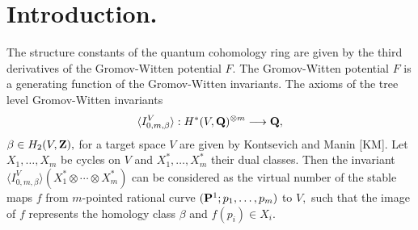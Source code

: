 \section{Introduction.}

The structure constants of the quantum cohomology ring 
are given by the third derivatives of the Gromov-Witten 
potential $F.$ The Gromov-Witten potential $F$ is a 
generating function of the Gromov-Witten invariants. 
The axioms of the tree level Gromov-Witten invariants 
$$ \langle I_{0, m, \beta}^{V} \rangle : 
H^{\ast}(V,{\bf Q})^{\otimes m} \longrightarrow {\bf Q}, 
$$
$\beta \in H_2 (V,{\bf Z}),$ 
for a target space $V$ are given by Kontsevich and Manin [KM]. 
Let $X_1,\ldots ,X_m$ be cycles on $V$ and $X_1^{\ast},\ldots ,
X_m^{\ast}$ their dual classes. Then the invariant 
$\langle I_{0,m,\beta}^V \rangle (X_1^{\ast}\otimes \cdots 
\otimes X_m^{\ast} )$ can be considered as the virtual 
number of the stable maps $f$ from $m$-pointed rational curve 
$({\bf P}^1 ; p_1,\ldots ,p_m)$ to $V,$ such that 
the image of $f$ represents the homology class $\beta$ and 
$f(p_i)\in X_i.$ 

